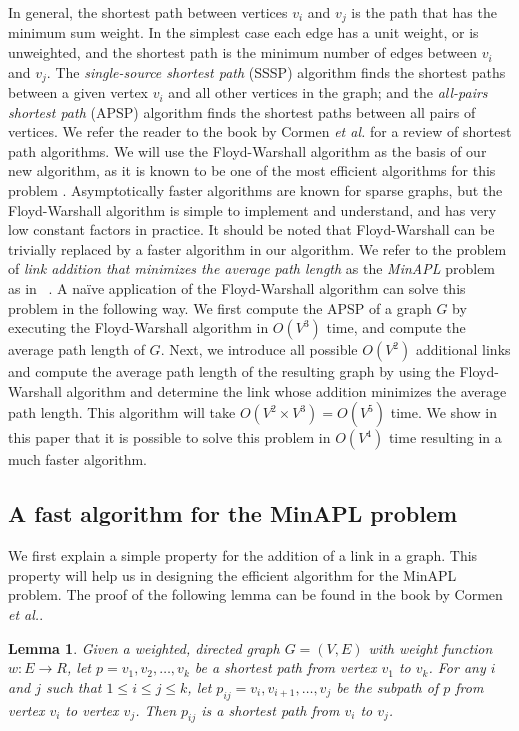 \documentclass[10pt,letterpaper]{article}
\newtheorem{lemma}{Lemma}
\begin{document}
In general, the shortest path between vertices $v_i$ and $v_j$ is the path that has the minimum sum weight. 
In the simplest case each edge has a unit weight, or is unweighted, and the shortest path is the minimum 
number of edges between $v_i$ and $v_j$. 
The {\em single-source shortest path} (SSSP) algorithm finds the shortest paths between a given 
vertex $v_i$ and 
all other vertices in the graph; and the {\em all-pairs shortest path} (APSP) algorithm finds the shortest paths 
between all pairs of vertices. We refer the reader to the book by Cormen {\em et al.}\cite{CLRS} for a review of 
shortest path algorithms. 
We will use the Floyd-Warshall algorithm as the basis of our new algorithm, as it is known to be one of the most 
efficient algorithms for this problem \cite{CLRS}. Asymptotically faster algorithms are known for sparse graphs, but the Floyd-Warshall algorithm is simple to implement and understand, and has very low constant factors in practice. It should be noted that Floyd-Warshall can be trivially replaced by a faster algorithm in our algorithm.
We refer to the problem of {\em link addition that minimizes the average path length} as the {\em MinAPL} problem 
as in ~\cite{GCM}. A na\"ive application of the Floyd-Warshall algorithm can solve this problem in the following way. 
We first compute the APSP of a graph $G$ by executing the Floyd-Warshall algorithm in $O(V^3)$ time, and compute the 
average path length of $G$. Next, we introduce all possible $O(V^2)$ additional links and compute the average 
path length of the resulting graph by using the Floyd-Warshall algorithm and determine the link whose addition 
minimizes the average path length. This algorithm will take $O(V^2\times V^3)=O(V^5)$ time. We show in this 
paper that it is possible to solve this problem in $O(V^4)$ time resulting in a much faster algorithm. 


\subsection*{A fast algorithm for the MinAPL problem}

We first explain a simple property for the addition of a link in a graph. This property will help us in 
designing the efficient algorithm for the MinAPL problem. The proof of the following lemma can be found in 
the book by Cormen {\em et al.}\cite{CLRS}.

\begin{lemma}
\label{lemma1}
Given a weighted, directed graph $G=(V,E)$ with weight function $w:E\rightarrow R$, let 
$p=v_1, v_2, \dots, v_k$ be a shortest path from vertex $v_1$ to $v_k$. For any $i$ and $j$ 
such that $1\leq i\leq j\leq k$, let $p_{ij}=v_i,v_{i+1},\dots, v_j$ be the subpath of $p$ from vertex $v_i$ to 
vertex $v_j$. Then $p_{ij}$ is a shortest path from $v_i$ to $v_j$. 
\end{lemma}
\end{document}

